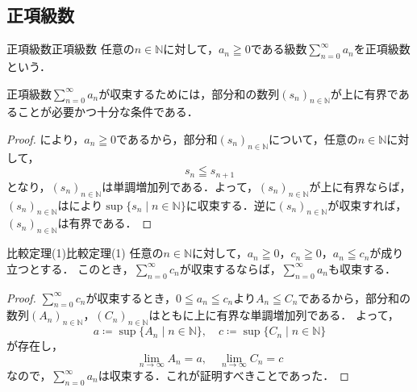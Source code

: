 \subsection{正項級数}

\begin{definition}{正項級数}{正項級数}
  任意の$n \in \mathbb{N}$に対して，$a_n \geqq 0$である級数$\sum_{n=0}^{\infty} a_n$を正項級数という．
\end{definition}

\begin{theorem}{}{}
  正項級数$\sum_{n=0}^{\infty} a_n$が収束するためには，部分和の数列$(s_n)_{n \in \mathbb{N}}$が上に有界であることが必要かつ十分な条件である．
\end{theorem}

\begin{leftbar}
  \begin{proof}
    により，$a_n \geqq 0$であるから，部分和$(s_n)_{n \in \mathbb{N}}$について，任意の$n \in \mathbb{N}$に対して，
    \[
      s_n \leqq s_{n+1}
    \]
    となり，$(s_n)_{n \in \mathbb{N}}$は単調増加列である．よって，$(s_n)_{n \in \mathbb{N}}$が上に有界ならば，$(s_n)_{n \in \mathbb{N}}$はにより$\sup \{s_n \mid n \in \mathbb{N}\}$に収束する．逆に$(s_n)_{n \in \mathbb{N}}$が収束すれば，$(s_n)_{n \in \mathbb{N}}$は有界である．
  \end{proof}
\end{leftbar}

\begin{theorem}{比較定理(1)}{比較定理(1)}
  任意の$n \in \mathbb{N}$に対して，$a_n \geqq 0$，$c_n \geqq 0$，$a_n \leqq c_n$が成り立つとする．
  このとき，$\sum_{n=0}^{\infty} c_n$が収束するならば，$\sum_{n=0}^{\infty} a_n$も収束する．
\end{theorem}

\begin{tleftbar}
\begin{proof}
  $\sum_{n=0}^{\infty} c_n$が収束するとき，$0 \leqq a_n \leqq c_n$より$A_n \leqq C_n$であるから，部分和の数列$(A_n)_{n \in \mathbb{N}}$，$(C_n)_{n \in \mathbb{N}}$はともに上に有界な単調増加列である．
  よって，
  \[
    a \coloneqq \sup \{ A_n \mid n \in \mathbb{N} \} ,\quad c \coloneqq \sup \{ C_n \mid n \in \mathbb{N} \}
  \]
  が存在し，
  \[
    \lim_{n \to \infty} A_n =a ,\quad \lim_{n \to \infty} C_n =c
  \]
  なので，$\sum_{n=0}^{\infty} a_n$は収束する．これが証明すべきことであった．
\end{proof}
\end{tleftbar}

